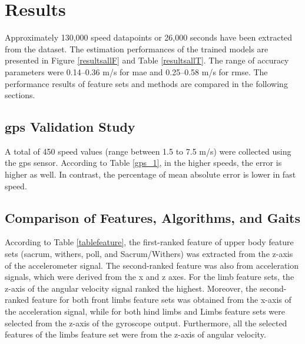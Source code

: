 \section{Results}
\label{sec:results}

Approximately 130,000 speed datapoints or 26,000 seconds have been extracted from the dataset. The estimation performances of the trained models are presented in Figure \ref{resultsallF} and Table \ref{resultsallT}. The range of accuracy parameters were 0.14--0.36 m/s for \gls{mae} and 0.25--0.58 m/s for \gls{rmse}. The performance results of feature sets and methods are compared in the following sections.



\subsection{\gls{gps} Validation Study}
A total of 450 speed values (range between 1.5 to 7.5 m/s) were collected using the \gls{gps} sensor. According to Table \ref{gps_1}, in the higher speeds, the error is higher as well. In contrast, the percentage of mean absolute error is lower in fast speed. 



\subsection{Comparison of Features, Algorithms, and Gaits}
According to Table \ref{tablefeature}, the first-ranked feature of upper body feature sets (sacrum, withers, poll, and Sacrum/Withers) was extracted from the z-axis of the accelerometer signal. The second-ranked feature was also from acceleration signals, which were derived from the x and z axes. For the limb feature sets, the z-axis of the angular velocity signal ranked the highest. Moreover, the second-ranked feature for both front limbs feature sets was obtained from the x-axis of the acceleration signal, while for both hind limbs and Limbs feature sets were selected from the z-axis of the gyroscope output. Furthermore, all the selected features of the limbs feature set were from the z-axis of angular velocity. 



